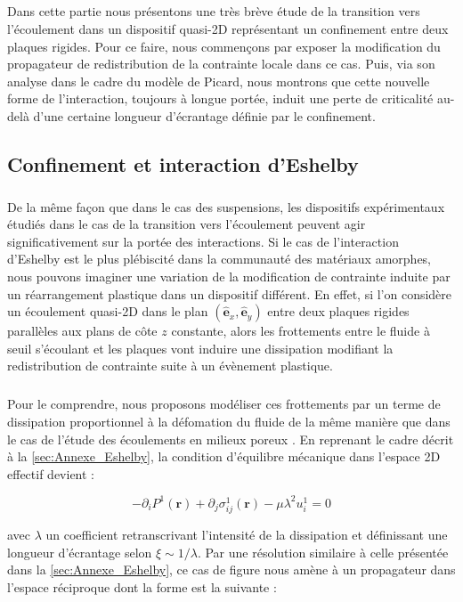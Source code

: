 \label{sec:lambda_picard}

\subparagraph{}Dans cette partie nous présentons une très brève étude de la transition vers l'écoulement dans un dispositif quasi-2D représentant un confinement entre deux plaques rigides. Pour ce faire, nous commençons par exposer la modification du propagateur de redistribution de la contrainte locale dans ce cas. Puis, via son analyse dans le cadre du modèle de Picard, nous montrons que cette nouvelle forme de l'interaction, toujours à longue portée, induit une perte de criticalité au-delà d'une certaine longueur d'écrantage définie par le confinement.

\subsection{Confinement et interaction d'Eshelby}

\subparagraph{}De la même façon que dans le cas des suspensions, les dispositifs expérimentaux étudiés dans le cas de la transition vers l'écoulement peuvent agir significativement sur la portée des interactions. Si le cas de l'interaction d'Eshelby est le plus plébiscité dans la communauté des matériaux amorphes, nous pouvons imaginer une variation de la modification de contrainte induite par un réarrangement plastique dans un dispositif différent. En effet, si l'on considère un écoulement quasi-2D dans le plan $(\hat{\mathbf{e}}_x, \hat{\mathbf{e}}_y)$ entre deux plaques rigides parallèles aux plans de côte $z$ constante, alors les frottements entre le fluide à seuil s'écoulant et les plaques vont induire une dissipation modifiant la redistribution de contrainte suite à un évènement plastique. 

\subparagraph{}Pour le comprendre, nous proposons modéliser ces frottements par un terme de dissipation proportionnel à la défomation du fluide de la même manière que dans le cas de l'étude des écoulements en milieux poreux \cite{long_note_2001}. En reprenant le cadre décrit à la \autoref{sec:Annexe_Eshelby}, la condition d'équilibre mécanique dans l'espace 2D effectif devient :

\begin{equation}
	-\partial_i P^1(\mathbf{r}) + \partial_j\sigma_{ij}^1(\mathbf{r}) - \mu\lambda^2 u^1_{i}= 0
\end{equation}

\noindent avec $\lambda$ un coefficient retranscrivant l'intensité de la dissipation et définissant une longueur d'écrantage selon $\xi \sim 1/\lambda$. Par une résolution similaire à celle présentée dans la \autoref{sec:Annexe_Eshelby}, ce cas de figure nous amène à un propagateur dans l'espace réciproque dont la forme est la suivante :

